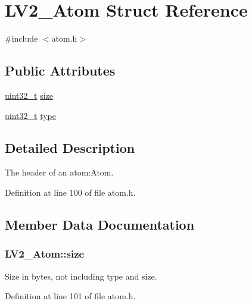 \hypertarget{struct_l_v2___atom}{}\section{L\+V2\+\_\+\+Atom Struct Reference}
\label{struct_l_v2___atom}


{\ttfamily \#include $<$atom.\+h$>$}

\subsection*{Public Attributes}
\begin{DoxyCompactItemize}
\item 
\hyperlink{lib-src_2ffmpeg_2win32_2stdint_8h_a6eb1e68cc391dd753bc8ce896dbb8315}{uint32\+\_\+t} \hyperlink{struct_l_v2___atom_a0f2fb72ad77d6e3dc119c56b40a6d639}{size}
\item 
\hyperlink{lib-src_2ffmpeg_2win32_2stdint_8h_a6eb1e68cc391dd753bc8ce896dbb8315}{uint32\+\_\+t} \hyperlink{struct_l_v2___atom_a5d13f0da49ed0ad1102b651220d930cb}{type}
\end{DoxyCompactItemize}


\subsection{Detailed Description}
The header of an atom\+:Atom. 

Definition at line 100 of file atom.\+h.



\subsection{Member Data Documentation}
\subsubsection[{\texorpdfstring{size}{size}}]{ L\+V2\+\_\+\+Atom\+::size}\hypertarget{struct_l_v2___atom_a0f2fb72ad77d6e3dc119c56b40a6d639}{}\label{struct_l_v2___atom_a0f2fb72ad77d6e3dc119c56b40a6d639}
Size in bytes, not including type and size. 

Definition at line 101 of file atom.\+h.

